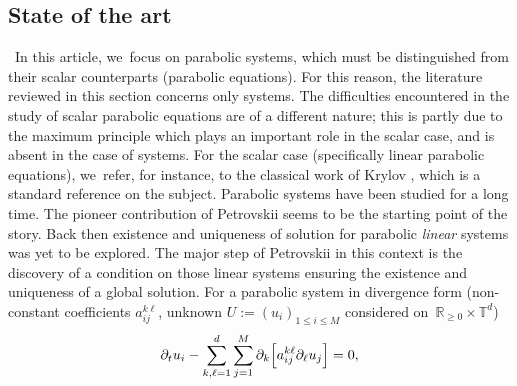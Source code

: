 \documentclass[JEP,XML,SOM,Unicode,published]{cedram}
\theoremstyle{definition}
\newcommand\R{\mathbb{R}}
\newcommand\T{\mathbb{T}}
\begin{document}
\subsection{State of the art}\label{state of the art}
\
{In this article, we~focus on parabolic systems, which must be distinguished from their scalar counterparts (parabolic equations). For this reason, the literature reviewed in this section concerns only systems. The difficulties encountered in the study of scalar parabolic equations are of a different nature; this is partly due to the maximum principle which plays an important role in the scalar case, and is absent in the case of systems. For the scalar case (specifically linear parabolic equations), we~refer, for instance, to the classical work of Krylov \cite{krylov}, which is a standard reference on the subject.} Parabolic systems have been studied for a long time. The pioneer contribution of Petrovskii \cite{petrorigine} seems to be the starting point of the story. Back then existence and uniqueness of solution for parabolic \emph{linear} systems was yet to be explored. The major step of Petrovskii in this context is the discovery of a condition on those linear systems ensuring the existence and uniqueness of a global solution. For a parabolic system in divergence form (non-constant coefficients $a_{ij}^{k\ell}$, unknown $U:=(u_i)_{1\leq i\leq M}$ considered on~$\R_{\geq 0}\times\T^d$)
\begin{align}\label{eq:u}
\partial_t u_i - \sum_{k,\ell=1}^d \sum_{j=1}^M \partial_k \Bigl[a_{ij}^{k\ell} \partial_\ell u_j \Bigr] = 0,
\end{align}
\end{document}
